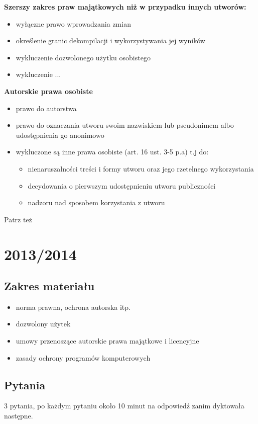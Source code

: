 \documentclass[12pt,a4paper]{article}
\begin{document}
\textbf{Szerszy zakres praw majątkowych niż w przypadku innych utworów:}
\begin{itemize}
\item wyłączne prawo wprowadzania zmian
\item określenie granic dekompilacji i wykorzystywania jej wyników
\item wykluczenie dozwolonego użytku osobistego
\item wykluczenie ...
\end{itemize}
\noindent
\textbf{Autorskie prawa osobiste}
\begin{itemize}
\item prawo do autorstwa
\item prawo do oznaczania utworu swoim nazwiskiem lub pseudonimem albo udostępnienia go anonimowo
\item wykluczone są inne prawa osobiste (art. 16 ust. 3-5 p.a) t.j do:
	\begin{itemize}
		\item nienaruszalności treści i formy utworu oraz jego rzetelnego wykorzystania
		\item decydowania o pierwszym udostępnieniu utworu publiczności
		\item nadzoru nad sposobem korzystania z utworu
	\end{itemize}
\end{itemize}

Patrz też 

\section{2013/2014}
\subsection{Zakres materiału}
\begin{itemize}
	\item norma prawna, ochrona autorska itp.
	\item dozwolony użytek
	\item umowy przenoszące autorskie prawa majątkowe i licencyjne
	\item zasady ochrony programów komputerowych
\end{itemize}

\subsection{Pytania}
3 pytania, po każdym pytaniu około 10 minut na odpowiedź zanim dyktowała następne.
\end{document}
